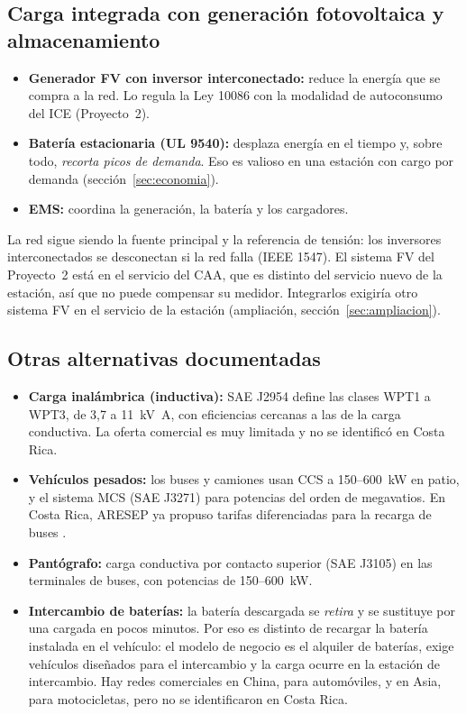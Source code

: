 \subsection{Carga integrada con generación fotovoltaica y almacenamiento}
\begin{itemize}
\item \textbf{Generador FV con inversor interconectado:} reduce la energía que se compra a la red. Lo regula la Ley 10086 con la modalidad de autoconsumo del ICE (Proyecto~2).
\item \textbf{Batería estacionaria (UL 9540):} desplaza energía en el tiempo y, sobre todo, \emph{recorta picos de demanda}. Eso es valioso en una estación con cargo por demanda (sección~\ref{sec:economia}).
\item \textbf{EMS:} coordina la generación, la batería y los cargadores.
\end{itemize}
La red sigue siendo la fuente principal y la referencia de tensión: los inversores interconectados se desconectan si la red falla (IEEE 1547). El sistema FV del Proyecto~2 está en el servicio del CAA, que es distinto del servicio nuevo de la estación, así que no puede compensar su medidor. Integrarlos exigiría otro sistema FV en el servicio de la estación (ampliación, sección~\ref{sec:ampliacion}).

\subsection{Otras alternativas documentadas}
\begin{itemize}
\item \textbf{Carga inalámbrica (inductiva):} SAE J2954 define las clases WPT1 a WPT3, de 3,7 a \SI{11}{\kilo\volt\ampere}, con eficiencias cercanas a las de la carga conductiva. La oferta comercial es muy limitada y no se identificó en Costa Rica.
\item \textbf{Vehículos pesados:} los buses y camiones usan CCS a 150--\SI{600}{\kilo\watt} en patio, y el sistema MCS (SAE J3271) para potencias del orden de megavatios. En Costa Rica, ARESEP ya propuso tarifas diferenciadas para la recarga de buses \cite{teletica}.
\item \textbf{Pantógrafo:} carga conductiva por contacto superior (SAE J3105) en las terminales de buses, con potencias de 150--\SI{600}{\kilo\watt}.
\item \textbf{Intercambio de baterías:} la batería descargada se \emph{retira} y se sustituye por una cargada en pocos minutos. Por eso es distinto de recargar la batería instalada en el vehículo: el modelo de negocio es el alquiler de baterías, exige vehículos diseñados para el intercambio y la carga ocurre en la estación de intercambio. Hay redes comerciales en China, para automóviles, y en Asia, para motocicletas, pero no se identificaron en Costa Rica.
\end{itemize}

